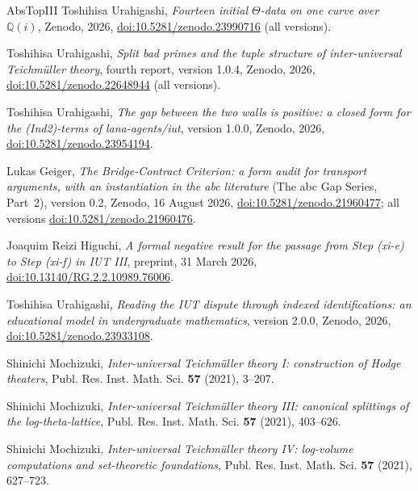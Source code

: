 \documentclass[11pt,a4paper]{article}
\newcommand{\Q}{\mathbb{Q}}
\begin{document}
\begin{thebibliography}{AbsTopIII}
Toshihisa Urahigashi, \emph{Fourteen initial $\Theta$-data on one curve over $\Q(i)$}, Zenodo, 2026,
\href{https://doi.org/10.5281/zenodo.23990716}{doi:10.5281/zenodo.23990716} (all versions).

Toshihisa Urahigashi, \emph{Split bad primes and the tuple structure of inter-universal {T}eichm\"uller theory}, fourth
report, version 1.0.4, Zenodo, 2026, \href{https://doi.org/10.5281/zenodo.22648944}{doi:10.5281/zenodo.22648944} (all
versions).

Toshihisa Urahigashi, \emph{The gap between the two walls is positive: a closed form for the (Ind2)-terms of
lana-agents/iut}, version 1.0.0, Zenodo, 2026, \href{https://doi.org/10.5281/zenodo.23954194}{doi:10.5281/zenodo.23954194}.

Lukas Geiger, \emph{The {B}ridge-{C}ontract {C}riterion: a form audit for transport arguments, with an instantiation in
the abc literature} (The abc Gap Series, Part~2), version 0.2, Zenodo, 16 August 2026,
\href{https://doi.org/10.5281/zenodo.21960477}{doi:10.5281/zenodo.21960477}; all versions
\href{https://doi.org/10.5281/zenodo.21960476}{doi:10.5281/zenodo.21960476}.

Joaquim Reizi Higuchi, \emph{A formal negative result for the passage from {S}tep (xi-e) to {S}tep (xi-f) in {IUT}
{III}}, preprint, 31 March 2026, \href{https://doi.org/10.13140/RG.2.2.10989.76006}{doi:10.13140/RG.2.2.10989.76006}.

Toshihisa Urahigashi, \emph{Reading the IUT dispute through indexed identifications: an educational model in
undergraduate mathematics}, version 2.0.0, Zenodo, 2026,
\href{https://doi.org/10.5281/zenodo.23933108}{doi:10.5281/zenodo.23933108}.

Shinichi Mochizuki, \emph{Inter-universal {T}eichm\"uller theory {I}: construction of {H}odge theaters}, Publ. Res.
Inst. Math. Sci. \textbf{57} (2021), 3--207.

Shinichi Mochizuki, \emph{Inter-universal {T}eichm\"uller theory {III}: canonical splittings of the log-theta-lattice},
Publ. Res. Inst. Math. Sci. \textbf{57} (2021), 403--626.

Shinichi Mochizuki, \emph{Inter-universal {T}eichm\"uller theory {IV}: log-volume computations and set-theoretic
foundations}, Publ. Res. Inst. Math. Sci. \textbf{57} (2021), 627--723.


\end{thebibliography}
\end{document}
